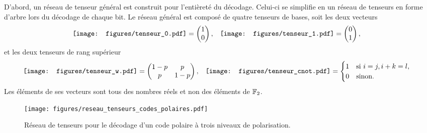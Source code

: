 D'abord, 
un réseau de tenseur général est construit
pour l'entièreté du décodage.
Celui-ci se simplifie en un réseau de tenseurs en forme d'arbre
lors du décodage de chaque bit.
Le réseau général est composé de quatre tenseurs de bases,
soit les deux vecteurs
\begin{align}
  &\vcenter{\hbox{\texttt{[image: figures/tenseur\_0.pdf]}}}
  =\begin{pmatrix}1\\0\end{pmatrix},
  &&\vcenter{\hbox{\texttt{[image: figures/tenseur\_1.pdf]}}}
  =\begin{pmatrix}0\\1\end{pmatrix},
  \label{eq:tenseurs_01}
\end{align}
et les deux tenseurs de rang supérieur
\begin{align}
  &\vcenter{\hbox{\texttt{[image: figures/tenseur\_w.pdf]}}}
  =
  \begin{pmatrix}1 - p & p \\ p & 1 - p\end{pmatrix}, 
  &&\vcenter{\hbox{\texttt{[image: figures/tenseur\_cnot.pdf]}}}
  =
  \begin{cases}
    1 & \text{si } i = j, i + k = l, \\
    0 & \text{sinon}.
  \end{cases}
  \label{eq:tenseurs_cp}
\end{align}
Les éléments de ses vecteurs sont tous des nombres réels et non des éléments de $\mathbb{F}_{2}$.

\begin{figure}
  \begin{center}
    \texttt{[image: figures/reseau\_tenseurs\_codes\_polaires.pdf]}
  \end{center}
  \caption[Exemple d'un réseau de tenseur pour décoder un code polaire]{
    Réseau de tenseurs pour le décodage d'un code polaire à trois niveaux de polarisation.
  }
  \label{fig:reseau_tenseurs_codes_polaires}
\end{figure}

